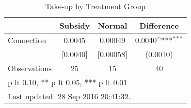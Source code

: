 \begin{table}[htbp]\centering
\def\sym#1{\ifmmode^{#1}\else\(^{#1}\)\fi}
\caption{Take-up by Treatment Group \label{tab:"balance"}}
\begin{tabular*}{0.9\hsize}{@{\hskip\tabcolsep\extracolsep\fill}l*{1}{ccc}}
\toprule
                                &Subsidy&  Normal&Difference         \\
\midrule
Connection                      &   0.0045&  0.00049&   0.0040\sym{***}\\
                                & [0.0040]&[0.00058]& (0.0010)         \\
\midrule
Observations                    &       25&       15&       40           \\
\bottomrule
\multicolumn{4}{l}{\footnotesize * p lt 0.10, ** p lt 0.05, *** p lt 0.01}\\
\multicolumn{4}{l}{\footnotesize Last updated: 28 Sep 2016 20:41:32.}\\
\end{tabular*}
\end{table}
